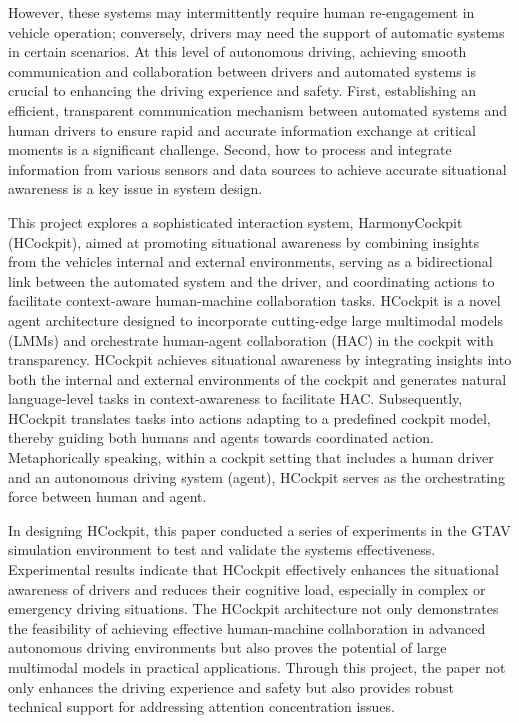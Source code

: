 \documentclass[
]{article}
\begin{document}
However, these systems may intermittently require human re-engagement in
vehicle operation; conversely, drivers may need the support of automatic
systems in certain scenarios. At this level of autonomous driving,
achieving smooth communication and collaboration between drivers and
automated systems is crucial to enhancing the driving experience and
safety. First, establishing an efficient, transparent communication
mechanism between automated systems and human drivers to ensure rapid
and accurate information exchange at critical moments is a significant
challenge. Second, how to process and integrate information from various
sensors and data sources to achieve accurate situational awareness is a
key issue in system design.

This project explores a sophisticated interaction system, HarmonyCockpit
(HCockpit), aimed at promoting situational awareness by combining
insights from the vehicle\textquotesingle s internal and external
environments, serving as a bidirectional link between the automated
system and the driver, and coordinating actions to facilitate
context-aware human-machine collaboration tasks. HCockpit is a novel
agent architecture designed to incorporate cutting-edge large multimodal
models (LMMs) and orchestrate human-agent collaboration (HAC) in the
cockpit with transparency. HCockpit achieves situational awareness by
integrating insights into both the internal and external environments of
the cockpit and generates natural language-level tasks in
context-awareness to facilitate HAC. Subsequently, HCockpit translates
tasks into actions adapting to a predefined cockpit model, thereby
guiding both humans and agents towards coordinated action.
Metaphorically speaking, within a cockpit setting that includes a human
driver and an autonomous driving system (agent), HCockpit serves as the
orchestrating force between human and agent.

In designing HCockpit, this paper conducted a series of experiments in
the GTAV simulation environment to test and validate the
system\textquotesingle s effectiveness. Experimental results indicate
that HCockpit effectively enhances the situational awareness of drivers
and reduces their cognitive load, especially in complex or emergency
driving situations. The HCockpit architecture not only demonstrates the
feasibility of achieving effective human-machine collaboration in
advanced autonomous driving environments but also proves the potential
of large multimodal models in practical applications. Through this
project, the paper not only enhances the driving experience and safety
but also provides robust technical support for addressing attention
concentration issues.
\end{document}
